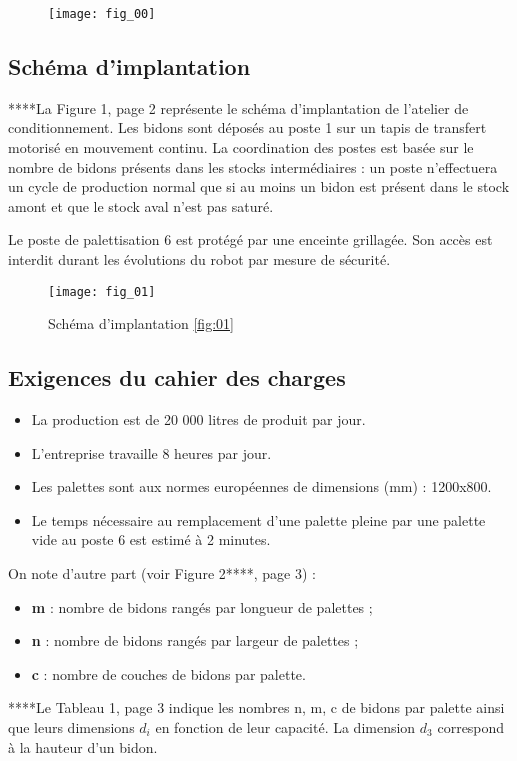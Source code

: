 \begin{figure}[H]
\centering
\texttt{[image: fig\_00]}
\end{figure}


\subsection{Schéma d’implantation}
****La Figure 1, page 2 représente le schéma d’implantation de l’atelier de conditionnement. Les 
bidons sont déposés au poste 1 sur un tapis de transfert motorisé en mouvement continu. La 
coordination des postes est basée sur le nombre de bidons présents dans les stocks 
intermédiaires : un poste n’effectuera un cycle de production normal que si au moins un bidon 
est présent dans le stock amont et que le stock aval n’est pas saturé.

Le poste de palettisation 6 est protégé par une enceinte grillagée. Son accès est interdit durant 
les évolutions du robot par mesure de sécurité. 


\begin{figure}[H]
\centering
\texttt{[image: fig\_01]}
\caption{Schéma d'implantation \ref{fig:01}}
\end{figure}

\subsection{Exigences du cahier des charges}
\begin{itemize}
\item La production est de 20 000 litres de produit par jour. 
\item L’entreprise travaille 8 heures par jour. 
\item Les palettes sont aux normes européennes de dimensions (mm) : 1200x800. 
\item Le temps nécessaire au remplacement d’une palette pleine par une palette vide au 
poste 6 est estimé à 2 minutes. 
\end{itemize}
On note d’autre part (voir Figure 2****, page 3) :
\begin{itemize}
\item \textbf{m} : nombre de bidons rangés par longueur de palettes ; 
\item \textbf{n} : nombre de bidons rangés par largeur de palettes ; 
\item \textbf{c} : nombre de couches de bidons par palette. 
\end{itemize}
****Le Tableau 1, page 3 indique les nombres n, m, c de bidons par palette ainsi que leurs 
dimensions $d_i$ en fonction de leur capacité. La dimension $d_3$ correspond à la hauteur d’un 
bidon. 


